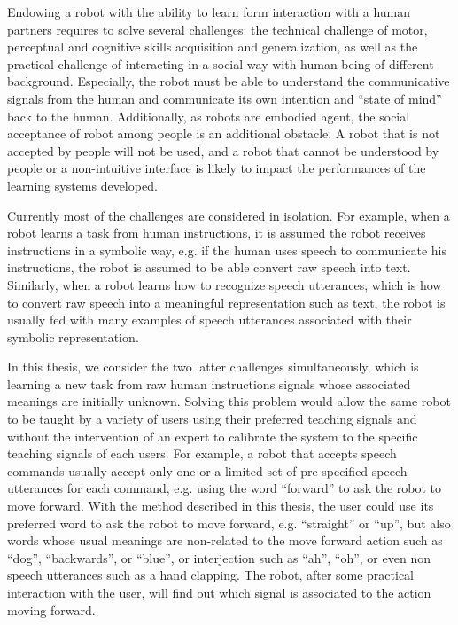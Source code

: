 Endowing a robot with the ability to learn form interaction with a human partners requires to solve several challenges: the technical challenge of motor, perceptual and cognitive skills acquisition and generalization, as well as the practical challenge of interacting in a social way with human being of different background. Especially, the robot must be able to understand the communicative signals from the human and communicate its own intention and ``state of mind'' back to the human. Additionally, as robots are embodied agent, the social acceptance of robot among people is an additional obstacle. A robot that is not accepted by people will not be used, and a robot that cannot be understood by people or a non-intuitive interface is likely to impact the performances of the learning systems developed.

Currently most of the challenges are considered in isolation. For example, when a robot learns a task from human instructions, it is assumed the robot receives instructions in a symbolic way, e.g. if the human uses speech to communicate his instructions, the robot is assumed to be able convert raw speech into text. Similarly, when a robot learns how to recognize speech utterances, which is how to convert raw speech into a meaningful representation such as text, the robot is usually fed with many examples of speech utterances associated with their symbolic representation.

In this thesis, we consider the two latter challenges simultaneously, which is learning a new task from raw human instructions signals whose associated meanings are initially unknown. Solving this problem would allow the same robot to be taught by a variety of users using their preferred teaching signals and without the intervention of an expert to calibrate the system to the specific teaching signals of each users. For example, a robot that accepts speech commands usually accept only one or a limited set of pre-specified speech utterances for each command, e.g. using the word ``forward'' to ask the robot to move forward. With the method described in this thesis, the user could use its preferred word to ask the robot to move forward, e.g. ``straight'' or ``up'', but also words whose usual meanings are non-related to the move forward action such as ``dog'', ``backwards'', or ``blue'', or interjection such as ``ah'', ``oh'', or even non speech utterances such as a hand clapping. The robot, after some practical interaction with the user, will find out which signal is associated to the action moving forward.

